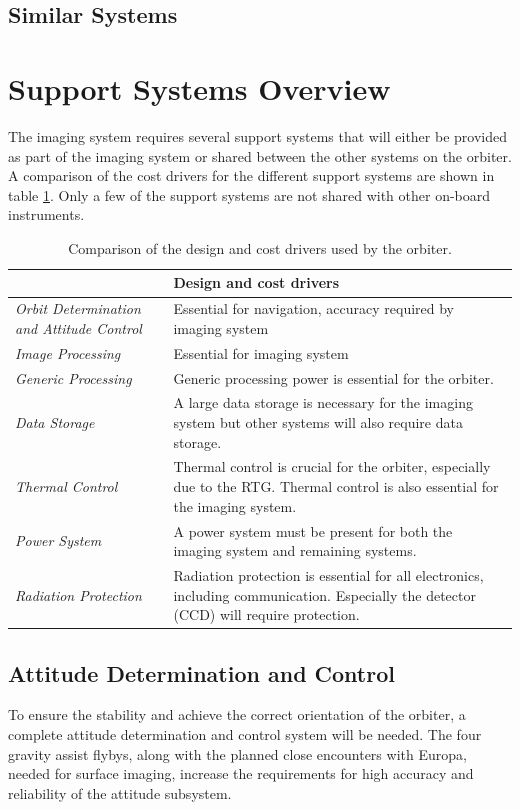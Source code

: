 \subsection{Similar Systems}
\section{Support Systems Overview}
The imaging system requires several support systems that will either be provided as part of the imaging system or shared between the other systems on the orbiter. A comparison of the cost drivers for the different support systems are shown in table \ref{tab:design_cost_driver}. Only a few of the support systems are not shared with other on-board instruments.
\begin{table}[htb!]
  \centering
\begin{tabular}{p{4cm}|p{11cm}}
\toprule
      & \textbf{Design and cost drivers} \\
\midrule
\textit{Orbit Determination and Attitude Control} & Essential for navigation, accuracy required by imaging system \\
\textit{Image Processing} & Essential for imaging system \\
\textit{Generic Processing} & Generic processing power is essential for the orbiter. \\
\textit{Data Storage} & A large data storage is necessary for the imaging system but other systems will also require data storage. \\
\textit{Thermal Control} & Thermal control is crucial for the orbiter, especially due to the RTG. Thermal control is also essential for the imaging system. \\
\textit{Power System} & A power system must be present for both the imaging system and remaining systems. \\
\textit{Radiation Protection} & Radiation protection is essential for all electronics, including communication. Especially the detector (CCD) will require protection. \\
\bottomrule
\end{tabular}%
  \caption{Comparison of the design and cost drivers used by the orbiter.}
  \label{tab:design_cost_driver}%
\end{table}%
\subsection{Attitude Determination and Control}
To ensure the stability and achieve the correct orientation of the orbiter, a complete attitude determination and control system will be needed. The four gravity assist flybys, along with the planned close encounters with Europa, needed for surface imaging, increase the requirements for high accuracy and reliability of the attitude subsystem.

